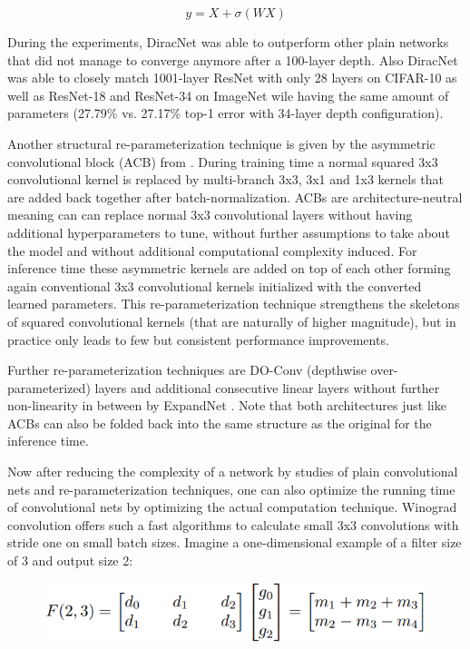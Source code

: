 \begin{equation}
	y = X + \sigma(WX)
\end{equation}

During the experiments, DiracNet was able to outperform other plain networks that did not manage to converge anymore after a 100-layer depth. Also DiracNet was able to closely match 1001-layer ResNet with only 28 layers on CIFAR-10 as well as ResNet-18 and ResNet-34 on ImageNet wile having the same amount of parameters (27.79\% vs. 27.17\% top-1 error with 34-layer depth configuration). 

Another structural re-parameterization technique is given by the asymmetric convolutional block (ACB) from \cite{XiaohanDing.2019}. During training time a normal squared 3x3 convolutional kernel is replaced by multi-branch 3x3, 3x1 and 1x3 kernels that are added back together after batch-normalization. ACBs are architecture-neutral meaning can can replace normal 3x3 convolutional layers without having additional hyperparameters to tune, without further assumptions to take about the model and without additional computational complexity induced. For inference time these asymmetric kernels are added on top of each other forming again conventional 3x3 convolutional kernels initialized with the converted learned parameters. This re-parameterization technique strengthens the skeletons of squared convolutional kernels (that are naturally of higher magnitude), but in practice only leads to few but consistent performance improvements.  

Further re-parameterization techniques are DO-Conv (depthwise over-parameterized) layers \cite{JinmingCao.2020} and additional consecutive linear layers without further non-linearity in between by ExpandNet \cite{ShuxuanGuo.2021}. Note that both architectures just like ACBs can also be folded back into the same structure as the original for the inference time. 

Now after reducing the complexity of a network by studies of plain convolutional nets and re-parameterization techniques, one can also optimize the running time of convolutional nets by optimizing the actual computation technique. Winograd convolution offers such a fast algorithms to calculate small 3x3 convolutions with stride one on small batch sizes. Imagine a one-dimensional example of a filter size of 3 and output size 2:

\begin{figure}[ht]
	\begin{center}
		\includegraphics[width=0.8\linewidth]{images/winograd1.PNG}
	\end{center}
	\label{fig:winograd1}
\end{figure}

